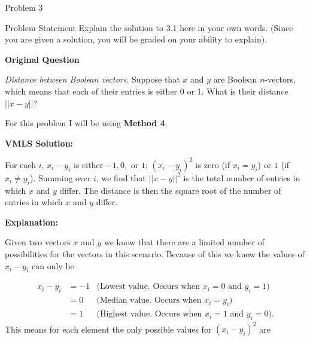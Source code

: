 \begin{problem}{Problem 3}
    \begin{statement}{Problem Statement}
        Explain the solution to 3.1 here in your own words. (Since you are given a solution, you will be graded on your ability to explain). \vspace*{1em}

        \textbf{Original Question} \vspace*{1em}

        \textit{Distance between Boolean vectors}. Suppose that $x$ and $y$ are Boolean $n$-vectors, which means that each of their entries is either 0 or 1. What is their distance $||x-y||$?
    \end{statement}

    \begin{Highlight}[Solution]
        For this problem I will be using \textbf{Method 4}. \vspace*{1em}

        \textbf{VMLS Solution:} \vspace*{1em}

        For each $i$, $x_{i}-y_{i}$ is either $-1,0,$ or $1$; $(x_{i}-y_{i})^{2}$ is zero (if $x_{i} = y_{i}$) or $1$ (if $x_{i} \neq y_{i}$). Summing over $i$, we find that $||x-y||^{2}$ is the total
        number of entries in which $x$ and $y$ differ. The distance is then the square root of the number of entries in which $x$ and $y$ differ. \vspace*{1em}

        \textbf{Explanation:} \vspace*{1em}

        Given two vectors $x$ and $y$ we know that there are a limited number of possibilities for the vectors in this scenario. Because of this we know the values of $x_{i} - y_{i}$ can only be

        \setcounter{equation}{0}
        \begin{align}
            x_{i} - y_{i} & = -1 & \text{(Lowest value. Occurs when $x_{i} = 0$ and $y_{i} = 1$)} \\
            & = 0 & \text{(Median value. Occurs when $x_{i} = y_{i}$)} \\
            & = 1 & \text{(Highest value. Occurs when $x_{i} = 1$ and $y_{i} = 0$)}.
        \end{align}
        This means for each element the only possible values for $(x_{i} - y_{i})^{2}$ are 


\end{Highlight}
\end{problem}
